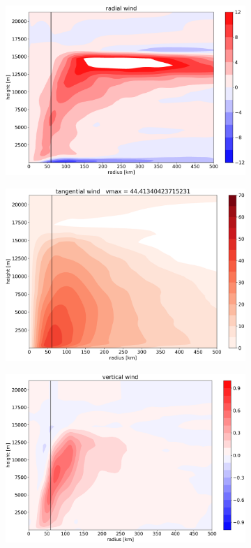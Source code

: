 \begin{figure}[!htb]
	\centering
	\begin{subfigure}{.5\linewidth}
		\centering
		\includegraphics[width=0.85\linewidth]{img/0299554radwind20130905T120000Z_redo.png}
	\end{subfigure}%
	\begin{subfigure}{.5\linewidth}
		\centering
		\includegraphics[width=0.85\linewidth]{img/0299554tanwind20130905T120000Z_redo.png}
	\end{subfigure}
	\begin{subfigure}{.5\linewidth}
		\centering
		\includegraphics[width=0.85\linewidth]{img/0299554verwind20130905T120000Z_redo.png}

\end{subfigure}
\end{figure}
